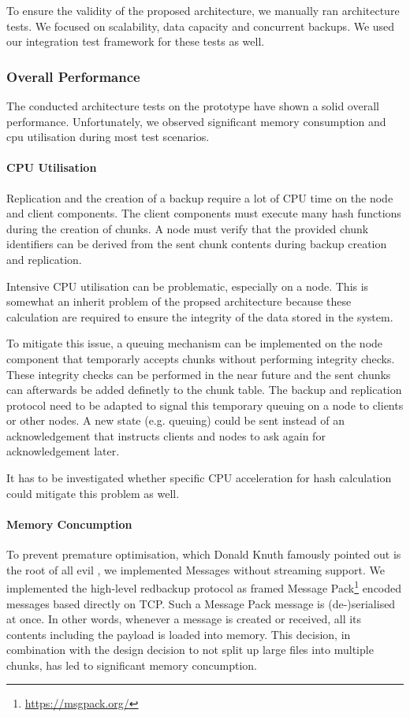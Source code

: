 To ensure the validity of the proposed architecture, we manually ran architecture tests. We focused on scalability, data capacity and concurrent backups. We used our integration test framework for these tests as well.

\subsubsection{Overall Performance}

The conducted architecture tests on the prototype have shown a solid overall performance. Unfortunately, we observed significant memory consumption and cpu utilisation during most test scenarios.

\paragraph{CPU Utilisation}
Replication and the creation of a backup require a lot of CPU time on the node and client components. The client components must execute many hash functions during the creation of chunks. A node must verify that the provided chunk identifiers can be derived from the sent chunk contents during backup creation and replication.

Intensive CPU utilisation can be problematic, especially on a node. This is somewhat an inherit problem of the propsed architecture because these calculation are required to ensure the integrity of the data stored in the system.

To mitigate this issue, a queuing mechanism can be implemented on the node component that temporarly accepts chunks without performing integrity checks. These integrity checks can be performed in the near future and the sent chunks can afterwards be added definetly to the chunk table. The backup and replication protocol need to be adapted to signal this temporary queuing on a node to clients or other nodes. A new state (e.g. queuing) could be sent instead of an acknowledgement that instructs clients and nodes to ask again for acknowledgement later.

It has to be investigated whether specific CPU acceleration for hash calculation could mitigate this problem as well.

\paragraph{Memory Concumption}
To prevent premature optimisation, which Donald Knuth famously pointed out is the root of all evil \cite{knuth-optimise}, we implemented Messages without streaming support. We implemented the high-level redbackup protocol as framed Message Pack\footnote{\url{https://msgpack.org/}} encoded messages based directly on TCP. Such a Message Pack message is (de-)serialised at once. In other words, whenever a message is created or received, all its contents including the payload is loaded into memory. This decision, in combination with the design decision to not split up large files into multiple chunks, has led to significant memory concumption.

